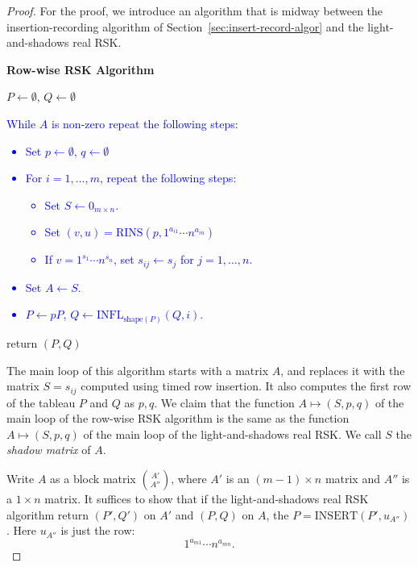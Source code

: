 \documentclass[10pt]{amsproc}
\theoremstyle{definition}
\theoremstyle{remark}
\newcommand{\rowins}{\mathrm{RINS}}
\newcommand{\ins}{\mathrm{INSERT}}
\newcommand{\shape}{\mathrm{shape}}
\newcommand{\ot}{\leftarrow}
\newcommand{\infl}{\mathrm{INFL}}
\begin{document}
\begin{proof}
  For the proof, we introduce an algorithm that is midway between the insertion-recording algorithm of Section~\ref{sec:insert-record-algor} and the light-and-shadows real RSK.
  \begin{center}
    \textbf{Row-wise RSK Algorithm}
  \end{center}
  \begin{itemize}
  \item $P\ot \emptyset$, $Q\ot \emptyset$
    \textcolor{blue}{
    \item While $A$ is non-zero repeat the following steps:
      \begin{itemize}
      \item Set $p\ot \emptyset$, $q\ot \emptyset$
      \item For $i=1,\dotsc,m$, repeat the following steps:
        \begin{itemize}
        \item Set $S\ot 0_{m\times n}$.
        \item Set $(v,u)=\rowins(p,1^{a_{i1}}\dotsb n^{a_{in}})$
        \item If $v=1^{s_1}\dotsb n^{s_n}$, set $s_{ij}\ot s_j$ for $j=1,\dotsc,n$.
        \end{itemize}
      \item Set $A\ot S$.
      \item $P\ot pP$, $Q\ot \infl_{\shape(P)}(Q,i)$.
      \end{itemize}
      }
    \item return $(P, Q)$
  \end{itemize}
  The main loop of this algorithm starts with a matrix $A$, and replaces it with the matrix $S=s_{ij}$ computed using timed row insertion.
  It also computes the first row of the tableau $P$ and $Q$ as $p, q$.
  We claim that the function $A\mapsto (S, p, q)$ of the main loop of the row-wise RSK algorithm is the same as the function $A\mapsto (S, p, q)$ of the main loop of the light-and-shadows real RSK.
  We call $S$ the \emph{shadow matrix} of $A$.

  Write $A$ as a block matrix $\binom{A'}{A''}$, where $A'$ is an $(m-1)\times n$ matrix and $A''$ is a $1\times n$ matrix.
  It suffices to show that if the light-and-shadows real RSK algorithm return $(P',Q')$ on $A'$ and $(P, Q)$ on $A$, the $P=\ins(P',u_{A''})$.
  Here $u_{A''}$ is just the row:
  \begin{displaymath}
    1^{a_{m1}}\dotsb n^{a_{mn}}.
  \end{displaymath}


\end{proof}
\end{document}
